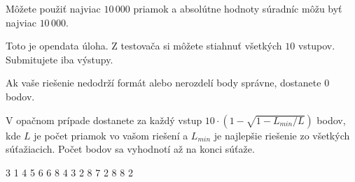 Môžete použiť najviac $10\,000$ priamok a absolútne hodnoty súradníc môžu byť najviac $10\,000$.

Toto je opendata úloha. Z testovača si môžete stiahnuť všetkých $10$ vstupov.
Submitujete iba výstupy.

Ak vaše riešenie nedodrží formát alebo nerozdelí body správne, dostanete $0$ bodov.

V opačnom prípade dostanete za každý vstup
$ 10 \cdot \left(1 - \sqrt{1 - L_{min} / L}\right)$ bodov,
kde $L$ je počet priamok vo vašom riešení a $L_{min}$ je najlepšie riešenie zo všetkých súťažiacich.
Počet bodov sa vyhodnotí až na konci súťaže.


3 1
4 5
6 6
8 4
3 2 8 7
2 8 8 2
\sampleEND


